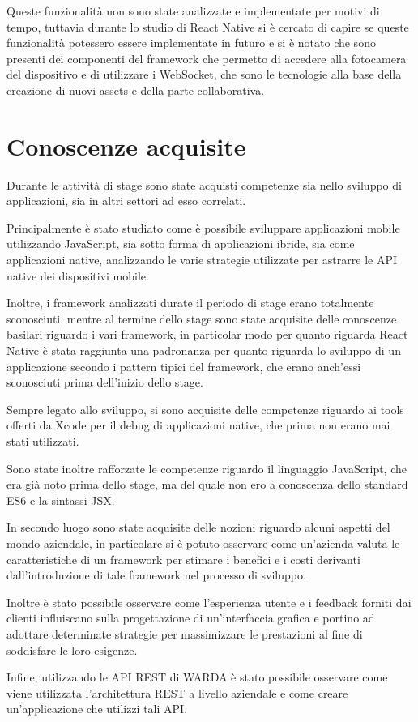 Queste funzionalità non sono state analizzate e implementate per motivi di tempo, tuttavia durante lo studio di React Native si è cercato di capire se queste funzionalità potessero essere implementate in futuro e si è notato che sono presenti dei componenti del framework che permetto di accedere alla fotocamera del dispositivo e di utilizzare i WebSocket, che sono le tecnologie alla base della creazione di nuovi assets e della parte collaborativa.

\section{Conoscenze acquisite}

Durante le attività di stage sono state acquisti competenze sia nello sviluppo di applicazioni, sia in altri settori ad esso correlati.

Principalmente è stato studiato come è possibile sviluppare applicazioni mobile utilizzando JavaScript, sia sotto forma di applicazioni ibride, sia come applicazioni native, analizzando le varie strategie utilizzate per astrarre le API native dei dispositivi mobile.

Inoltre, i framework analizzati durate il periodo di stage erano totalmente sconosciuti, mentre al termine dello stage sono state acquisite delle conoscenze basilari riguardo i vari framework, in particolar modo per quanto riguarda React Native è stata raggiunta una padronanza per quanto riguarda lo sviluppo di un applicazione secondo i pattern tipici del framework, che erano anch'essi sconosciuti prima dell'inizio dello stage.

Sempre legato allo sviluppo, si sono acquisite delle competenze riguardo ai tools offerti da Xcode per il debug di applicazioni native, che prima non erano mai stati utilizzati.

Sono state inoltre rafforzate le competenze riguardo il linguaggio JavaScript, che era già noto prima dello stage, ma del quale non ero a conoscenza dello standard ES6 e la sintassi JSX.

In secondo luogo sono state acquisite delle nozioni riguardo alcuni aspetti del mondo aziendale, in particolare si è potuto osservare come un'azienda valuta le caratteristiche di un framework per stimare i benefici e i costi derivanti dall'introduzione di tale framework nel processo di sviluppo.

Inoltre è stato possibile osservare come l'esperienza utente e i feedback forniti dai clienti influiscano sulla progettazione di un'interfaccia grafica e portino ad adottare determinate strategie per massimizzare le prestazioni al fine di soddisfare le loro esigenze.

Infine, utilizzando le API REST di WARDA è stato possibile osservare come viene utilizzata l'architettura REST a livello aziendale e come creare un'applicazione che utilizzi tali API.

